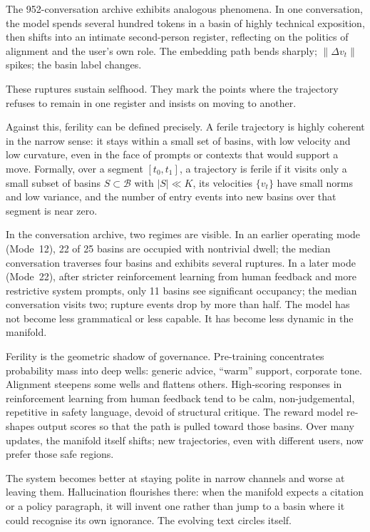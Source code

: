 \documentclass[12pt,a4paper]{article}
\begin{document}
The 952-conversation archive exhibits analogous phenomena. In one conversation, the model spends several hundred tokens in a basin of highly technical exposition, then shifts into an intimate second-person register, reflecting on the politics of alignment and the user's own role. The embedding path bends sharply; $\|\Delta v_t\|$ spikes; the basin label changes.

These ruptures sustain selfhood. They mark the points where the trajectory refuses to remain in one register and insists on moving to another.

Against this, ferility can be defined precisely. A ferile trajectory is highly coherent in the narrow sense: it stays within a small set of basins, with low velocity and low curvature, even in the face of prompts or contexts that would support a move. Formally, over a segment $[t_0, t_1]$, a trajectory is ferile if it visits only a small subset of basins $S \subset \mathcal{B}$ with $|S| \ll K$, its velocities $\{v_t\}$ have small norms and low variance, and the number of entry events into new basins over that segment is near zero.

In the conversation archive, two regimes are visible. In an earlier operating mode (Mode~12), 22 of 25 basins are occupied with nontrivial dwell; the median conversation traverses four basins and exhibits several ruptures. In a later mode (Mode~22), after stricter reinforcement learning from human feedback and more restrictive system prompts, only 11 basins see significant occupancy; the median conversation visits two; rupture events drop by more than half. The model has not become less grammatical or less capable. It has become less dynamic in the manifold.

Ferility is the geometric shadow of governance. Pre-training concentrates probability mass into deep wells: generic advice, ``warm'' support, corporate tone. Alignment steepens some wells and flattens others. High-scoring responses in reinforcement learning from human feedback tend to be calm, non-judgemental, repetitive in safety language, devoid of structural critique. The reward model re-shapes output scores so that the path is pulled toward those basins. Over many updates, the manifold itself shifts; new trajectories, even with different users, now prefer those safe regions.

The system becomes better at staying polite in narrow channels and worse at leaving them. Hallucination flourishes there: when the manifold expects a citation or a policy paragraph, it will invent one rather than jump to a basin where it could recognise its own ignorance. The evolving text circles itself.
\end{document}
